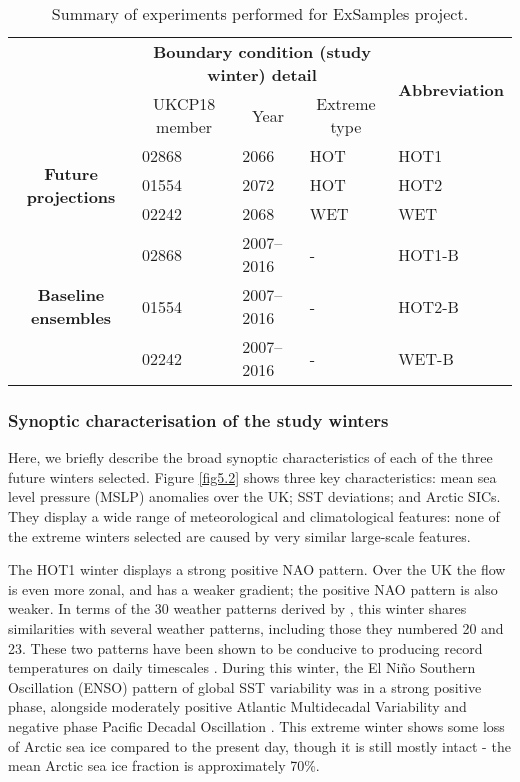       \begin{table}[h]
        \centering
        \footnotesize
        \begin{tabular}{cllll}
          \toprule
          \multicolumn{1}{l}{\multirow{2}{*}{}}&\multicolumn{3}{c}{\textbf{Boundary condition (study winter) detail}}&\multicolumn{1}{c}{\multirow{2}{*}{\textbf{Abbreviation}}}\\\cmidrule(lr){2-4}
          \multicolumn{1}{l}{}&\multicolumn{1}{c}{UKCP18 member}&\multicolumn{1}{c}{Year}&\multicolumn{1}{c}{Extreme type}&\multicolumn{1}{c}{}\\\midrule
          \multirow{3}{*}{\textbf{Future projections}}&\multicolumn{1}{l}{02868}&\multicolumn{1}{l}{2066}&HOT&HOT1\\
          &\multicolumn{1}{l}{01554}&\multicolumn{1}{l}{2072}&HOT&HOT2\\
          &\multicolumn{1}{l}{02242}&\multicolumn{1}{l}{2068}&WET&WET\\\midrule
          \multirow{3}{*}{\textbf{Baseline ensembles}}&\multicolumn{1}{l}{02868}&\multicolumn{1}{l}{2007--2016}&-&HOT1-B\\
          &\multicolumn{1}{l}{01554}&\multicolumn{1}{l}{2007--2016}&-&HOT2-B\\
          &\multicolumn{1}{l}{02242}&\multicolumn{1}{l}{2007--2016}&-&WET-B\\\bottomrule
        \end{tabular}
        \caption{Summary of experiments performed for ExSamples project.}
        \end{table}

    \subsubsection{Synoptic characterisation of the study winters}

      Here, we briefly describe the broad synoptic characteristics of each of the three future winters selected. Figure \ref{fig5.2} shows three key characteristics: mean sea level pressure (MSLP) anomalies over the UK; SST deviations; and Arctic SICs. They display a wide range of meteorological and climatological features: none of the extreme winters selected are caused by very similar large-scale features.

      The HOT1 winter displays a strong positive NAO pattern. Over the UK the flow is even more zonal, and has a weaker gradient; the positive NAO pattern is also weaker. In terms of the 30 weather patterns derived by \citep{neal_flexible_2016}, this winter shares similarities with several weather patterns, including those they numbered 20 and 23. These two patterns have been shown to be conducive to producing record temperatures on daily timescales \citep{kendon_temperature_2020}. During this winter, the El Niño Southern Oscillation (ENSO) pattern of global SST variability was in a strong positive phase, alongside moderately positive Atlantic Multidecadal Variability and negative phase Pacific Decadal Oscillation \citep{deser_sea_2010}. This extreme winter shows some loss of Arctic sea ice compared to the present day, though it is still mostly intact - the mean Arctic sea ice fraction is approximately 70\%.

